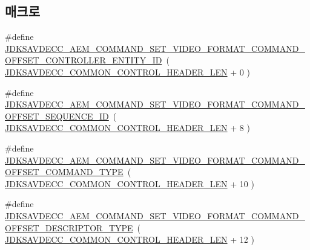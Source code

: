 \subsection*{매크로}
\begin{DoxyCompactItemize}
\item 
\#define \hyperlink{group__command__set__video__format_ga9ed1154017de9ec5a08773ee08accb49}{J\+D\+K\+S\+A\+V\+D\+E\+C\+C\+\_\+\+A\+E\+M\+\_\+\+C\+O\+M\+M\+A\+N\+D\+\_\+\+S\+E\+T\+\_\+\+V\+I\+D\+E\+O\+\_\+\+F\+O\+R\+M\+A\+T\+\_\+\+C\+O\+M\+M\+A\+N\+D\+\_\+\+O\+F\+F\+S\+E\+T\+\_\+\+C\+O\+N\+T\+R\+O\+L\+L\+E\+R\+\_\+\+E\+N\+T\+I\+T\+Y\+\_\+\+ID}~( \hyperlink{group__jdksavdecc__avtp__common__control__header_gaae84052886fb1bb42f3bc5f85b741dff}{J\+D\+K\+S\+A\+V\+D\+E\+C\+C\+\_\+\+C\+O\+M\+M\+O\+N\+\_\+\+C\+O\+N\+T\+R\+O\+L\+\_\+\+H\+E\+A\+D\+E\+R\+\_\+\+L\+EN} + 0 )
\item 
\#define \hyperlink{group__command__set__video__format_ga6f027e81c10d562e08ff7aadde64035c}{J\+D\+K\+S\+A\+V\+D\+E\+C\+C\+\_\+\+A\+E\+M\+\_\+\+C\+O\+M\+M\+A\+N\+D\+\_\+\+S\+E\+T\+\_\+\+V\+I\+D\+E\+O\+\_\+\+F\+O\+R\+M\+A\+T\+\_\+\+C\+O\+M\+M\+A\+N\+D\+\_\+\+O\+F\+F\+S\+E\+T\+\_\+\+S\+E\+Q\+U\+E\+N\+C\+E\+\_\+\+ID}~( \hyperlink{group__jdksavdecc__avtp__common__control__header_gaae84052886fb1bb42f3bc5f85b741dff}{J\+D\+K\+S\+A\+V\+D\+E\+C\+C\+\_\+\+C\+O\+M\+M\+O\+N\+\_\+\+C\+O\+N\+T\+R\+O\+L\+\_\+\+H\+E\+A\+D\+E\+R\+\_\+\+L\+EN} + 8 )
\item 
\#define \hyperlink{group__command__set__video__format_gaa39cc2facbffa05665fd71003e1e7f97}{J\+D\+K\+S\+A\+V\+D\+E\+C\+C\+\_\+\+A\+E\+M\+\_\+\+C\+O\+M\+M\+A\+N\+D\+\_\+\+S\+E\+T\+\_\+\+V\+I\+D\+E\+O\+\_\+\+F\+O\+R\+M\+A\+T\+\_\+\+C\+O\+M\+M\+A\+N\+D\+\_\+\+O\+F\+F\+S\+E\+T\+\_\+\+C\+O\+M\+M\+A\+N\+D\+\_\+\+T\+Y\+PE}~( \hyperlink{group__jdksavdecc__avtp__common__control__header_gaae84052886fb1bb42f3bc5f85b741dff}{J\+D\+K\+S\+A\+V\+D\+E\+C\+C\+\_\+\+C\+O\+M\+M\+O\+N\+\_\+\+C\+O\+N\+T\+R\+O\+L\+\_\+\+H\+E\+A\+D\+E\+R\+\_\+\+L\+EN} + 10 )
\item 
\#define \hyperlink{group__command__set__video__format_ga6d4ddaf66fe6ea628bbe457ccbb2c374}{J\+D\+K\+S\+A\+V\+D\+E\+C\+C\+\_\+\+A\+E\+M\+\_\+\+C\+O\+M\+M\+A\+N\+D\+\_\+\+S\+E\+T\+\_\+\+V\+I\+D\+E\+O\+\_\+\+F\+O\+R\+M\+A\+T\+\_\+\+C\+O\+M\+M\+A\+N\+D\+\_\+\+O\+F\+F\+S\+E\+T\+\_\+\+D\+E\+S\+C\+R\+I\+P\+T\+O\+R\+\_\+\+T\+Y\+PE}~( \hyperlink{group__jdksavdecc__avtp__common__control__header_gaae84052886fb1bb42f3bc5f85b741dff}{J\+D\+K\+S\+A\+V\+D\+E\+C\+C\+\_\+\+C\+O\+M\+M\+O\+N\+\_\+\+C\+O\+N\+T\+R\+O\+L\+\_\+\+H\+E\+A\+D\+E\+R\+\_\+\+L\+EN} + 12 )

\end{DoxyCompactItemize}
